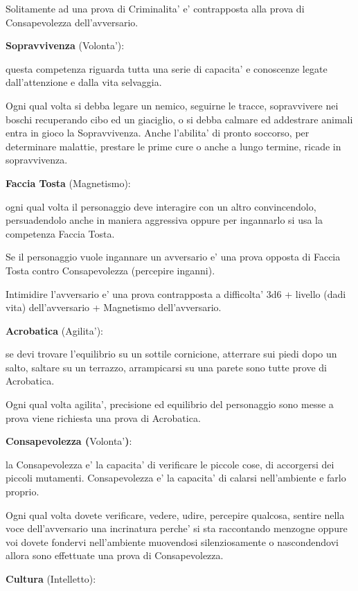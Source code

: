 \documentclass[a4paper,11pt,twoside,openany]{dndbook}
\begin{document}
Solitamente ad una prova di Criminalita' e' contrapposta alla prova di Consapevolezza dell'avversario.

\textbf{Sopravvivenza} (Volonta'):

questa competenza riguarda tutta una serie di capacita' e conoscenze legate dall'attenzione e dalla vita selvaggia.

Ogni qual volta si debba legare un nemico, seguirne le tracce, sopravvivere nei boschi recuperando cibo ed un giaciglio, o si debba calmare ed addestrare animali entra in gioco la Sopravvivenza.
Anche l'abilita' di pronto soccorso, per determinare malattie, prestare le prime cure o anche a lungo termine, ricade in sopravvivenza.

\textbf{Faccia Tosta} (Magnetismo):

ogni qual volta il personaggio deve interagire con un altro convincendolo, persuadendolo anche in maniera aggressiva oppure per ingannarlo si usa la competenza Faccia Tosta.

Se il personaggio vuole ingannare un avversario e' una prova opposta di Faccia Tosta contro Consapevolezza (percepire inganni).

Intimidire l'avversario e' una prova contrapposta a difficolta' 3d6 + livello (dadi vita) dell'avversario + Magnetismo dell'avversario.

\textbf{Acrobatica} (Agilita'):

se devi trovare l'equilibrio su un sottile cornicione, atterrare sui piedi dopo un salto, saltare su un terrazzo, arrampicarsi su una parete sono tutte prove di Acrobatica.

Ogni qual volta agilita', precisione ed equilibrio del personaggio sono messe a prova viene richiesta una prova di Acrobatica.

\textbf{Consapevolezza (}Volonta'\textbf{)}:

la Consapevolezza e' la capacita' di verificare le piccole cose, di accorgersi dei piccoli mutamenti. Consapevolezza e' la capacita' di calarsi nell'ambiente e farlo proprio.

Ogni qual volta dovete verificare, vedere, udire, percepire qualcosa, sentire nella voce dell'avversario una incrinatura perche' si sta raccontando menzogne oppure voi dovete fondervi nell'ambiente muovendosi silenziosamente o nascondendovi allora sono effettuate una prova di Consapevolezza.

\textbf{Cultura} (Intelletto):
\end{document}
